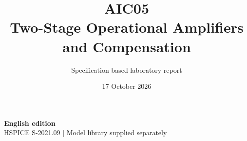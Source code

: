 \documentclass[11pt,a4paper]{article}
\title{\color{accent}AIC05\\[4pt]Two-Stage Operational Amplifiers and Compensation}
\author{Specification-based laboratory report}
\date{17 October 2026}
\begin{document}
\maketitle
\begin{center}\small\textbf{English edition}\\
HSPICE S-2021.09 \quad | \quad Model library supplied separately
\end{center}


\end{document}

